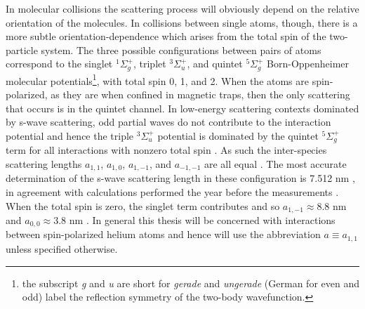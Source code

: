 	In molecular collisions the scattering process will obviously depend on the relative orientation of the molecules.
	In collisions between single atoms, though, there is a more subtle orientation-dependence which arises from the total spin of the two-particle system.
	The three possible configurations between pairs of \mhe atoms correspond to the singlet $^1\Sigma_g^+$, triplet $^3\Sigma_u^+$, and quintet $^5\Sigma_g^+$ Born-Oppenheimer molecular potentials\footnote{the subscript \emph{g} and \emph{u} are short for \emph{gerade} and \emph{ungerade} (German for even and odd) label the reflection symmetry of the two-body wavefunction.}, with total spin 0, 1, and 2.
	When the atoms are spin-polarized, as they are when confined in magnetic traps, then the only scattering that occurs is in the quintet channel.
	In low-energy scattering contexts dominated by s-wave scattering, odd partial waves do not contribute to the interaction potential and hence the triple $^3\Sigma_u^+$ potential is dominated by the quintet $^5\Sigma_g^+$ term for all interactions with nonzero total spin \cite{Leo01}. 
	As such the inter-species scattering lengths $a_{1,1}$, $a_{1,0}$, $a_{1,-1}$, and $a_{-1,-1}$ are all equal \cite{Leo01,Vassen16}.
	The most accurate determination of the s-wave scattering length in these configuration is 7.512 nm \cite{moal06}, in agreement with calculations performed the year before the measurements \cite{przybytek05}.
	When the total spin is zero, the singlet term contributes and so $a_{1,-1}\approx8.8$ nm and $a_{0,0}\approx3.8$ nm \cite{Leo01,Vassen16}.
	In general this thesis will be concerned with interactions between spin-polarized helium atoms and hence will use the abbreviation $a\equiv a_{1,1}$ unless specified otherwise.
	
